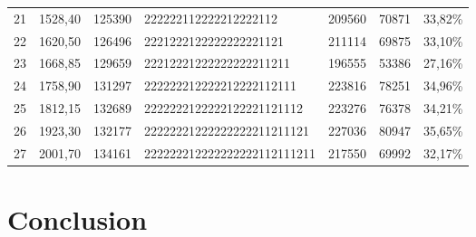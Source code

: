 \documentclass[preprint,12pt]{elsarticle}
\begin{document}
\begin{table}[htbp]
\begin{tabular}{rrrlrrr}
    21    & 1528,40 & 125390 & 222222112222212222112  & 209560 & 70871 & 33,82\% \\
    22    & 1620,50 & 126496 & 2221222122222222221121  & 211114 & 69875 & 33,10\% \\
    23    & 1668,85 & 129659 & 22212221222222222211211  & 196555 & 53386 & 27,16\% \\
    24    & 1758,90 & 131297 & 222222212222212222112111  & 223816 & 78251 & 34,96\% \\
    25    & 1812,15 & 132689 & 2222222122222122221121112 & 223276 & 76378 & 34,21\% \\
    26    & 1923,30 & 132177 & 22222221222222222211211121  & 227036 & 80947 & 35,65\% \\
    27    & 2001,70 & 134161 & 222222212222222222112111211 & 217550 & 69992 & 32,17\% \\
    \bottomrule
    \end{tabular}%
  \label{tab:addlabel}%
\end{table}%

\section{Conclusion}
\end{document}
